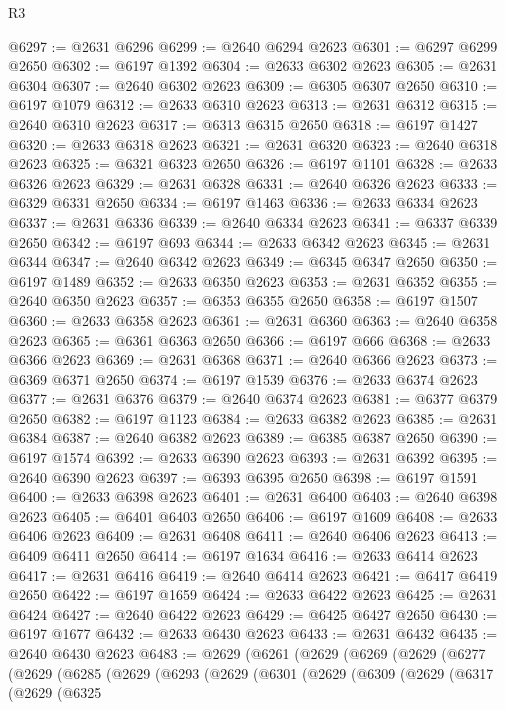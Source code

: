 \begin{lexlean}{R3}
\begin{coremodule}
@6297 := @2631 @6296
@6299 := @2640 @6294 @2623
@6301 := @6297 @6299 @2650
@6302 := @6197 @1392
@6304 := @2633 @6302 @2623
@6305 := @2631 @6304
@6307 := @2640 @6302 @2623
@6309 := @6305 @6307 @2650
@6310 := @6197 @1079
@6312 := @2633 @6310 @2623
@6313 := @2631 @6312
@6315 := @2640 @6310 @2623
@6317 := @6313 @6315 @2650
@6318 := @6197 @1427
@6320 := @2633 @6318 @2623
@6321 := @2631 @6320
@6323 := @2640 @6318 @2623
@6325 := @6321 @6323 @2650
@6326 := @6197 @1101
@6328 := @2633 @6326 @2623
@6329 := @2631 @6328
@6331 := @2640 @6326 @2623
@6333 := @6329 @6331 @2650
@6334 := @6197 @1463
@6336 := @2633 @6334 @2623
@6337 := @2631 @6336
@6339 := @2640 @6334 @2623
@6341 := @6337 @6339 @2650
@6342 := @6197 @693
@6344 := @2633 @6342 @2623
@6345 := @2631 @6344
@6347 := @2640 @6342 @2623
@6349 := @6345 @6347 @2650
@6350 := @6197 @1489
@6352 := @2633 @6350 @2623
@6353 := @2631 @6352
@6355 := @2640 @6350 @2623
@6357 := @6353 @6355 @2650
@6358 := @6197 @1507
@6360 := @2633 @6358 @2623
@6361 := @2631 @6360
@6363 := @2640 @6358 @2623
@6365 := @6361 @6363 @2650
@6366 := @6197 @666
@6368 := @2633 @6366 @2623
@6369 := @2631 @6368
@6371 := @2640 @6366 @2623
@6373 := @6369 @6371 @2650
@6374 := @6197 @1539
@6376 := @2633 @6374 @2623
@6377 := @2631 @6376
@6379 := @2640 @6374 @2623
@6381 := @6377 @6379 @2650
@6382 := @6197 @1123
@6384 := @2633 @6382 @2623
@6385 := @2631 @6384
@6387 := @2640 @6382 @2623
@6389 := @6385 @6387 @2650
@6390 := @6197 @1574
@6392 := @2633 @6390 @2623
@6393 := @2631 @6392
@6395 := @2640 @6390 @2623
@6397 := @6393 @6395 @2650
@6398 := @6197 @1591
@6400 := @2633 @6398 @2623
@6401 := @2631 @6400
@6403 := @2640 @6398 @2623
@6405 := @6401 @6403 @2650
@6406 := @6197 @1609
@6408 := @2633 @6406 @2623
@6409 := @2631 @6408
@6411 := @2640 @6406 @2623
@6413 := @6409 @6411 @2650
@6414 := @6197 @1634
@6416 := @2633 @6414 @2623
@6417 := @2631 @6416
@6419 := @2640 @6414 @2623
@6421 := @6417 @6419 @2650
@6422 := @6197 @1659
@6424 := @2633 @6422 @2623
@6425 := @2631 @6424
@6427 := @2640 @6422 @2623
@6429 := @6425 @6427 @2650
@6430 := @6197 @1677
@6432 := @2633 @6430 @2623
@6433 := @2631 @6432
@6435 := @2640 @6430 @2623
@6483 := @2629
    (@6261
      (@2629
        (@6269
          (@2629
            (@6277
              (@2629
                (@6285
                  (@2629
                    (@6293
                      (@2629
                        (@6301
                          (@2629
                            (@6309
                              (@2629
                                (@6317
                                  (@2629
                                    (@6325

\end{coremodule}
\end{lexlean}
